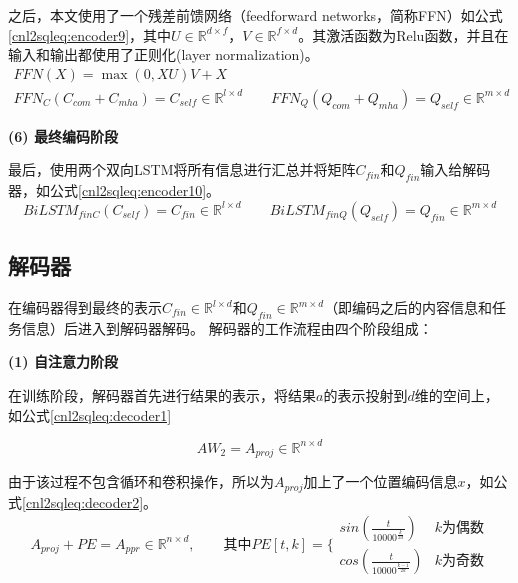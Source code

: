 之后，本文使用了一个残差前馈网络（feedforward networks，简称FFN）如公式\ref{cnl2sqleq:encoder9}，其中$U \in \mathbb{R}^{d \times f}$，$V \in \mathbb{R}^{f \times d}$。其激活函数为Relu函数\cite{Nair2010Rectified,vaswani2017attention}，并且在输入和输出都使用了正则化(layer normalization)\cite{Ba2016Layer}。
\begin{gather}
  \label{cnl2sqleq:encoder9}
  FFN(X) = \max(0,XU)V + X\\
  FFN_C(C_{com} + C_{mha}) = C_{self} \in \mathbb{R}^{l \times d} \qquad FFN_Q(Q_{com} + Q_{mha}) = Q_{self} \in \mathbb{R}^{m \times d}
\end{gather}

\textbf{(6) 最终编码阶段}

最后，使用两个双向LSTM将所有信息进行汇总并将矩阵$C_{fin}$和$Q_{fin}$输入给解码器，如公式\ref{cnl2sqleq:encoder10}。
\begin{equation}
  \label{cnl2sqleq:encoder10}
  BiLSTM_{finC}(C_{self}) = C_{fin} \in \mathbb{R}^{l \times d} \qquad BiLSTM_{finQ}(Q_{self}) = Q_{fin} \in \mathbb{R}^{m \times d} 
\end{equation}


\subsection{解码器}
\label{cnl2sql:decoder}

在编码器得到最终的表示$C_{fin} \in \mathbb{R}^{l \times d}$和$Q_{fin} \in \mathbb{R}^{m \times d}$（即编码之后的内容信息和任务信息）后进入到解码器解码。
解码器的工作流程由四个阶段组成：

\textbf{(1) 自注意力阶段}

在训练阶段，解码器首先进行结果的表示，将结果$a$的表示投射到$d$维的空间上，如公式\ref{cnl2sqleq:decoder1}

\begin{equation}
  \label{cnl2sqleq:decoder1}
  AW_2 = A_{proj} \in \mathbb{R}^{n \times d} 
\end{equation}

由于该过程不包含循环和卷积操作，所以为$A_{proj}$加上了一个位置编码信息$x$，如公式\ref{cnl2sqleq:decoder2}。
\begin{equation}
  \label{cnl2sqleq:decoder2}
  A_{proj} + PE = A_{ppr} \in \mathbb{R}^{n \times d},\qquad \mbox{其中} PE[t,k] = \{   
  \begin{array}{lr}
    sin(\frac{t}{10000^{\frac{k}{2d}}}) &  k\mbox{为偶数}\\
    cos(\frac{t}{10000^{\frac{k-1}{2d}}}) &  k\mbox{为奇数}
  \end{array}
\end{equation}

